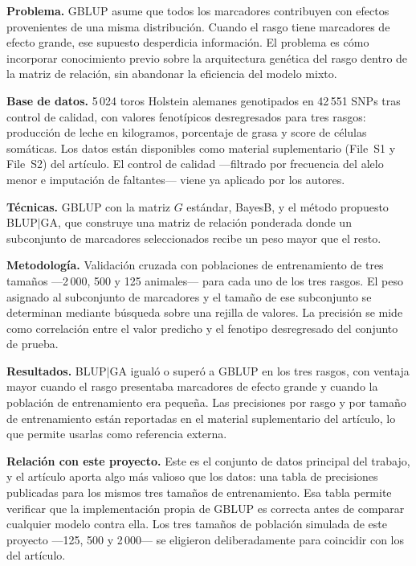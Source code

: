 \documentclass[conference]{IEEEtran}
\begin{document}
\textbf{Problema.} GBLUP asume que todos los marcadores contribuyen con
efectos provenientes de una misma distribución. Cuando el rasgo tiene
marcadores de efecto grande, ese supuesto desperdicia información. El
problema es cómo incorporar conocimiento previo sobre la arquitectura
genética del rasgo dentro de la matriz de relación, sin abandonar la
eficiencia del modelo mixto.

\textbf{Base de datos.} 5\,024 toros Holstein alemanes genotipados en
42\,551 SNPs tras control de calidad, con valores fenotípicos
desregresados para tres rasgos: producción de leche en kilogramos,
porcentaje de grasa y score de células somáticas. Los datos están
disponibles como material suplementario (File~S1 y File~S2) del artículo.
El control de calidad —filtrado por frecuencia del alelo menor e
imputación de faltantes— viene ya aplicado por los autores.

\textbf{Técnicas.} GBLUP con la matriz $G$ estándar, BayesB, y el método
propuesto BLUP$|$GA, que construye una matriz de relación ponderada donde
un subconjunto de marcadores seleccionados recibe un peso mayor que el
resto.

\textbf{Metodología.} Validación cruzada con poblaciones de entrenamiento
de tres tamaños —2\,000, 500 y 125 animales— para cada uno de los tres
rasgos. El peso asignado al subconjunto de marcadores y el tamaño de ese
subconjunto se determinan mediante búsqueda sobre una rejilla de valores.
La precisión se mide como correlación entre el valor predicho y el
fenotipo desregresado del conjunto de prueba.

\textbf{Resultados.} BLUP$|$GA igualó o superó a GBLUP en los tres
rasgos, con ventaja mayor cuando el rasgo presentaba marcadores de efecto
grande y cuando la población de entrenamiento era pequeña. Las precisiones
por rasgo y por tamaño de entrenamiento están reportadas en el material
suplementario del artículo, lo que permite usarlas como referencia
externa.

\textbf{Relación con este proyecto.} Este es el conjunto de datos
principal del trabajo, y el artículo aporta algo más valioso que los
datos: una tabla de precisiones publicadas para los mismos tres tamaños
de entrenamiento. Esa tabla permite verificar que la implementación propia
de GBLUP es correcta antes de comparar cualquier modelo contra ella. Los
tres tamaños de población simulada de este proyecto —125, 500 y 2\,000—
se eligieron deliberadamente para coincidir con los del artículo.

\end{document}
